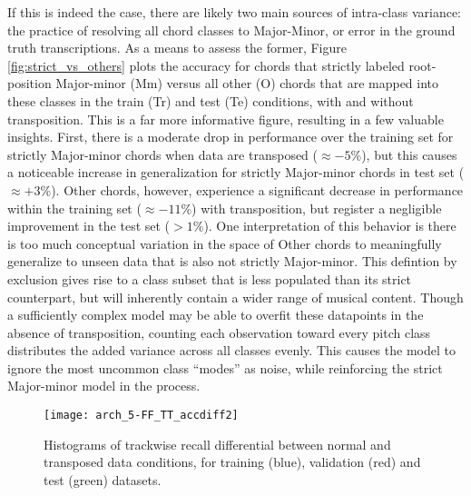 If this is indeed the case, there are likely two main sources of intra-class variance: the practice of resolving all chord classes to Major-Minor, or error in the ground truth transcriptions.
As a means to assess the former, Figure \ref{fig:strict_vs_others} plots the accuracy for chords that strictly labeled root-position Major-minor (Mm) versus all other (O) chords that are mapped into these classes in the train (Tr) and test (Te) conditions, with and without transposition.
This is a far more informative figure, resulting in a few valuable insights.
First, there is a moderate drop in performance over the training set for strictly Major-minor chords when data are transposed ($\approx -5\%$), but this causes a noticeable increase in generalization for strictly Major-minor chords in test set ($\approx +3\%$).
Other chords, however, experience a significant decrease in performance within the training set ($\approx -11\%$) with transposition, but register a negligible improvement in the test set ($>1\%$).
One interpretation of this behavior is there is too much conceptual variation in the space of Other chords to meaningfully generalize to unseen data that is also not strictly Major-minor.
This defintion by exclusion gives rise to a class subset that is less populated than its strict counterpart, but will inherently contain a wider range of musical content.
Though a sufficiently complex model may be able to overfit these datapoints in the absence of transposition, counting each observation toward every pitch class distributes the added variance across all classes evenly.
This causes the model to ignore the most uncommon class ``modes'' as noise, while reinforcing the strict Major-minor model in the process.


\begin{figure}[!t]
\centering
\texttt{[image: arch\_5-FF\_TT\_accdiff2]}
\caption{Histograms of trackwise recall differential between normal and transposed data conditions, for training (blue), validation (red) and test (green) datasets.}
\label{fig:acc_diff}
\end{figure}

